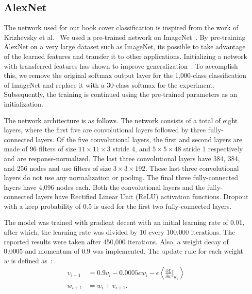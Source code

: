 \documentclass[conference]{IEEEtran}
\begin{document}
\subsection{AlexNet}
The network used for our book cover classification is inspired from the work of Krizhevsky et al.~\cite{krizhevsky2012imagenet} 
We used a pre-trained network on ImageNet~\cite{imagenet_cvpr09}.
By pre-training AlexNet on a very large dataset such as ImageNet, its possible to take advantage of the learned features and transfer it to other applications.
Initializing a network with transferred features has shown to improve generalization~\cite{yosinski2014transferable}.
To accomplish this, we remove the original softmax output layer for the 1,000-class classification of ImageNet and replace it with a 30-class softmax for the experiment.
Subsequently, the training is continued using the pre-trained parameters as an initialization.


The network architecture is as follows.
The network consists of a total of eight layers, where the first five are convolutional layers followed by three fully-connected layers. 
Of the five convolutional layers, the first and second layers are made of 96 filters of size $11 \times 11 \times 3$ stride 4, and $5 \times 5 \times 48$ stride 1 respectively and are response-normalized.
The last three convolutional layers have 384, 384, and 256 nodes and use filters of size $3 \times 3 \times 192$.
These last three convolutional layers do not use any normalization or pooling.
The final three fully-connected layers have 4,096 nodes each.
Both the convolutional layers and the fully-connected layers have Rectified Linear Unit (ReLU) activation functions.
Dropout with a keep probability of 0.5 is used for the first two fully-connected layers.

The model was trained with gradient decent with an initial learning rate of 0.01, after which, the learning rate was divided by 10 every 100,000 iterations.
The reported results were taken after 450,000 iterations.
Also, a weight decay of 0.0005 and momentum of 0.9 was implemented.
The update rule for each weight $w$ is defined as~\cite{krizhevsky2012imagenet}:
\begin{align}
v_{i+1} &= 0.9 v_i-0.0005 \epsilon w_i - \epsilon \left<\frac{\partial L}{\partial w}\bigr|_{w_i}\right> \\
w_{i+1} &= w_i + v_{i+1}.
\end{align}
\end{document}
